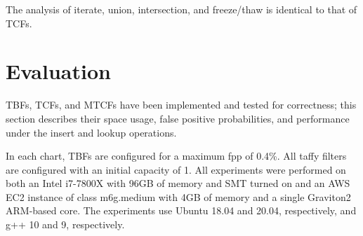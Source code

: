 \documentclass[letterpaper,twocolumn,10pt]{article}
\begin{document}

The analysis of iterate, union, intersection, and freeze/thaw is identical to that of TCFs.



\section{Evaluation}
\label{eval}


TBFs, TCFs, and MTCFs have been implemented and tested for correctness; this section describes their space usage, false positive probabilities, and performance under the insert and lookup operations.

In each chart, TBFs are configured for a maximum fpp of 0.4\%.
All taffy filters are configured with an initial capacity of 1. %
All experiments were performed on both an Intel i7-7800X with 96GB of memory and SMT turned on and an AWS EC2 instance of class m6g.medium with 4GB of memory and a single Graviton2 ARM-based core.
The experiments use Ubuntu 18.04 and 20.04, respectively, and g++ 10 and 9, respectively.
\end{document}
